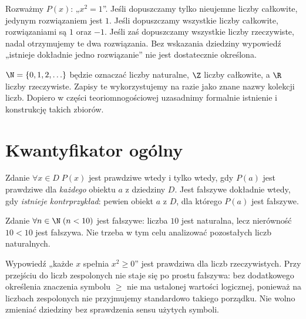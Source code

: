 \begin{przyklad}
Rozważmy $P(x)$: „$x^2=1$”. Jeśli dopuszczamy tylko
nieujemne liczby całkowite, jedynym rozwiązaniem jest $1$.
Jeśli dopuszczamy wszystkie liczby całkowite, rozwiązaniami
są $1$ oraz $-1$. Jeśli zaś dopuszczamy wszystkie liczby
rzeczywiste, nadal otrzymujemy te dwa rozwiązania.
Bez wskazania dziedziny wypowiedź „istnieje dokładnie jedno
rozwiązanie” nie jest dostatecznie określona.
\end{przyklad}

\begin{uwaga}
$\N=\{0,1,2,\ldots\}$ będzie oznaczać liczby naturalne,
$\Z$ liczby całkowite, a $\R$ liczby rzeczywiste.
Zapisy te wykorzystujemy na razie jako znane nazwy
kolekcji liczb. Dopiero w części teoriomnogościowej
uzasadnimy formalnie istnienie i konstrukcję takich zbiorów.
\end{uwaga}

\section{Kwantyfikator ogólny}\label{sec:forall}
\begin{definicja}\label{def:forall}
Zdanie $\forall x\in D\;P(x)$ jest prawdziwe wtedy i tylko
wtedy, gdy $P(a)$ jest prawdziwe dla \emph{każdego} obiektu
$a$ z dziedziny $D$. Jest fałszywe dokładnie wtedy, gdy
\emph{istnieje kontrprzykład}: pewien obiekt $a$ z $D$,
dla którego $P(a)$ jest fałszywe.
\end{definicja}

\begin{przyklad}
Zdanie $\forall n\in\N\;(n<10)$ jest fałszywe:
liczba $10$ jest naturalna, lecz nierówność $10<10$
jest fałszywa. Nie trzeba w tym celu analizować
pozostałych liczb naturalnych.
\end{przyklad}

\begin{przyklad}
Wypowiedź „każde $x$ spełnia $x^2\ge0$” jest prawdziwa
dla liczb rzeczywistych. Przy przejściu do liczb zespolonych
nie staje się po prostu fałszywa: bez dodatkowego
określenia znaczenia symbolu $\ge$ nie ma ustalonej
wartości logicznej, ponieważ na liczbach zespolonych
nie przyjmujemy standardowo takiego porządku.
Nie wolno zmieniać dziedziny bez sprawdzenia
sensu użytych symboli.
\end{przyklad}

